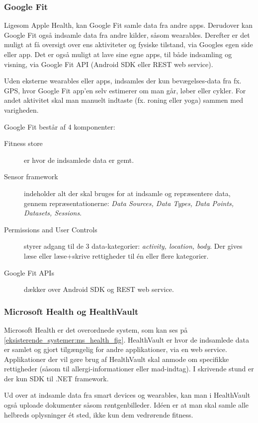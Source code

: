 \subsubsection{Google Fit}
Ligesom Apple Health, kan Google Fit samle data fra andre apps.
Derudover kan Google Fit også indsamle data fra andre kilder, såsom wearables.
Derefter er det muligt at få oversigt over ens aktiviteter og fysiske tilstand, via Googles egen side eller app.
Det er også muligt at lave sine egne apps, til både indsamling og visning, via Google Fit API (Android SDK eller REST web service).

Uden eksterne wearables eller apps, indsamles der kun bevægelses-data fra fx. GPS, hvor Google Fit app'en selv estimerer om man går, løber eller cykler.
For andet aktivitet skal man manuelt indtaste (fx. roning eller yoga) sammen med varigheden.

Google Fit består af 4 komponenter:

\begin{description}
\item[Fitness store] er hvor de indsamlede data er gemt.
\item[Sensor framework] indeholder alt der skal bruges for at indsamle og repræsentere data, gennem repræsentationerne: \textit{Data Sources, Data Types, Data Points, Datasets, Sessions}.
\item[Permissions and User Controls] styrer adgang til de 3 data-kategorier: \textit{activity, location, body}.
Der gives læse eller læse+skrive rettigheder til én eller flere kategorier.
\item[Google Fit APIs] dækker over Android SDK og REST web service.
\end{description}

\subsubsection{Microsoft Health og HealthVault}
Microsoft Health er det overordnede system, som kan ses på \cref{eksisterende_systemer:ms_health_fig}.
HealthVault er hvor de indsamlede data er samlet og gjort tilgængelig for andre applikationer, via en web service.
Applikationer der vil gøre brug af HealthVault skal anmode om specifikke rettigheder (såsom til allergi-informationer eller mad-indtag).
I skrivende stund er der kun SDK til .NET framework.

Ud over at indsamle data fra smart devices og wearables, kan man i HealthVault også uploade dokumenter såsom røntgenbilleder.
Idéen er at man skal samle alle helbreds oplysninger ét sted, ikke kun dem vedrørende fitness.

